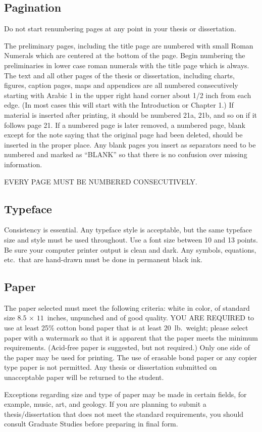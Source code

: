 \subsection{Pagination}
%
Do not start renumbering pages at any point in your thesis or dissertation.

The preliminary pages, including the title page are numbered with small Roman Numerals which are centered at the bottom of the page. Begin numbering the preliminaries in lower case roman numerals with the title page which is always. The text and all other pages of the thesis or dissertation, including charts, figures, caption pages, maps and appendices are all numbered consecutively starting with Arabic 1 in the upper right hand corner about 1/2 inch from each edge. (In most cases this will start with the Introduction or Chapter 1.) If material is inserted after printing, it should be numbered 21a, 21b, and so on if it follows page 21. If a numbered page is later removed, a numbered page, blank except for the note saying that the original page had been deleted, should be inserted in the proper place. Any blank pages you insert as separators need to be numbered and marked as ``BLANK'' so that there is no confusion over missing information.

EVERY PAGE MUST BE NUMBERED CONSECUTIVELY.

\subsection{Typeface}
%
Consistency is essential. Any typeface style is acceptable, but the same typeface size and style must be used throughout. Use a font size between 10 and 13 points. Be sure your computer printer output is clean and dark. Any symbols, equations, etc.\ that are hand-drawn must be done in permanent black ink.

\subsection{Paper}
%
The paper selected must meet the following criteria: white in color, of standard size $8.5\,\times\,11$~inches, unpunched and of good quality. YOU ARE REQUIRED to use at least 25\% cotton bond paper that is at least 20~lb.\ weight; please select paper with a watermark so that it is apparent that the paper meets the minimum requirements. (Acid-free paper is suggested, but not required.) Only one side of the paper may be used for printing. The use of erasable bond paper or any copier type paper is not permitted. Any thesis or dissertation submitted on unacceptable paper will be returned to the student.

Exceptions regarding size and type of paper may be made in certain fields, for example, music, art, and geology. If you are planning to submit a thesis\slash dissertation that does not meet the standard requirements, you should consult Graduate Studies before preparing in final form. 